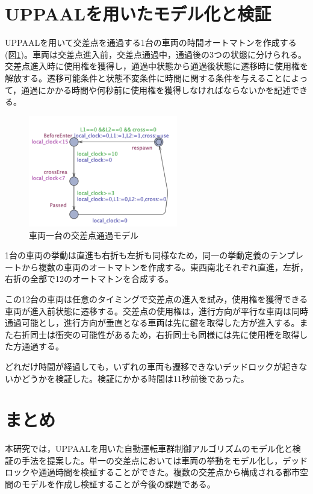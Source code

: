 \documentclass[10pt]{tpu-abst-utf}
\begin{document}
\section{UPPAALを用いたモデル化と検証}
UPPAALを用いて交差点を通過する1台の車両の時間オートマトンを作成する(図\ref{Simple})。車両は交差点進入前，交差点通過中，通過後の3つの状態に分けられる。交差点進入時に使用権を獲得し，通過中状態から通過後状態に遷移時に使用権を解放する。遷移可能条件と状態不変条件に時間に関する条件を与えることによって，通過にかかる時間や何秒前に使用権を獲得しなければならないかを記述できる。
\begin{figure}[htbp]
\centering
\includegraphics[width=65mm]{Simple.png}
\caption{車両一台の交差点通過モデル}
\label{Simple}
\end{figure}

1台の車両の挙動は直進も右折も左折も同様なため，同一の挙動定義のテンプレートから複数の車両のオートマトンを作成する。東西南北それぞれ直進，左折，右折の全部で12のオートマトンを合成する。

この12台の車両は任意のタイミングで交差点の進入を試み，使用権を獲得できる車両が進入前状態に遷移する。交差点の使用権は，進行方向が平行な車両は同時通過可能とし，進行方向が垂直となる車両は先に鍵を取得した方が進入する。また右折同士は衝突の可能性があるため，右折同士も同様には先に使用権を取得した方通過する。

どれだけ時間が経過しても，いずれの車両も遷移できないデッドロックが起きないかどうかを検証した。検証にかかる時間は11秒前後であった。
\section{まとめ}
本研究では，UPPAALを用いた自動運転車群制御アルゴリズムのモデル化と検証の手法を提案した。単一の交差点においては車両の挙動をモデル化し，デッドロックや通過時間を検証することができた。複数の交差点から構成される都市空間のモデルを作成し検証することが今後の課題である。
\begin{thebibliography}{1}
\end{thebibliography}
%
\end{document}
